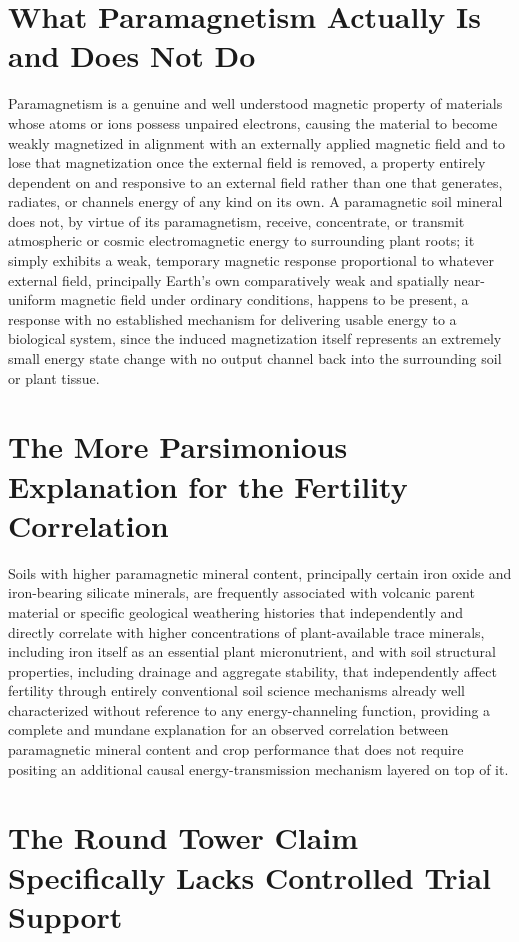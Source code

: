 \documentclass[11pt]{article}
\begin{document}
\section{What Paramagnetism Actually Is and Does Not Do}

Paramagnetism is a genuine and well understood magnetic property of materials whose atoms or ions possess unpaired electrons, causing the material to become weakly magnetized in alignment with an externally applied magnetic field and to lose that magnetization once the external field is removed, a property entirely dependent on and responsive to an external field rather than one that generates, radiates, or channels energy of any kind on its own. A paramagnetic soil mineral does not, by virtue of its paramagnetism, receive, concentrate, or transmit atmospheric or cosmic electromagnetic energy to surrounding plant roots; it simply exhibits a weak, temporary magnetic response proportional to whatever external field, principally Earth's own comparatively weak and spatially near-uniform magnetic field under ordinary conditions, happens to be present, a response with no established mechanism for delivering usable energy to a biological system, since the induced magnetization itself represents an extremely small energy state change with no output channel back into the surrounding soil or plant tissue.

\section{The More Parsimonious Explanation for the Fertility Correlation}

Soils with higher paramagnetic mineral content, principally certain iron oxide and iron-bearing silicate minerals, are frequently associated with volcanic parent material or specific geological weathering histories that independently and directly correlate with higher concentrations of plant-available trace minerals, including iron itself as an essential plant micronutrient, and with soil structural properties, including drainage and aggregate stability, that independently affect fertility through entirely conventional soil science mechanisms already well characterized without reference to any energy-channeling function, providing a complete and mundane explanation for an observed correlation between paramagnetic mineral content and crop performance that does not require positing an additional causal energy-transmission mechanism layered on top of it.

\section{The Round Tower Claim Specifically Lacks Controlled Trial Support}
\end{document}
